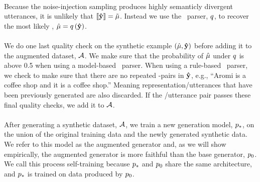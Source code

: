     \paragraph{} Because the noise-injection sampling produces highly
semanticly divergent utterances, it is unlikely that $\left\llbracket \boldsymbol{\hat{\mathbf{y}}}  \right\rrbracket = \tilde{\mu}$. Instead we use the \meaningrepresentation~parser, $q$, to
recover the most likely \meaningrepresentation, $\hat{\mu} = q\left(\boldsymbol{\hat{\mathbf{y}}}\right)$.

\paragraph{}
We do one last quality check on the synthetic example $(\hat{\mu},\boldsymbol{\hat{\mathbf{y}}})$ before adding it to the augmented dataset, ${\mathcal{A}}$. We make sure that
the probability of $\hat{\mu}$ under $q$ is above 0.5 when using
a model-based \meaningrepresentation~parser. When using a rule-based
\meaningrepresentation~parser, we check to make sure that there are no
repeated \attributevalue-pairs in $\boldsymbol{\hat{\mathbf{y}}}$, e.g., ``Aromi is a 
coffee shop and it is a coffee shop.'' Meaning representation/utterances that
have been previously generated are also discarded. If the \meaningrepresentation/utterance
pair passes these final quality checks, we add it to ${\mathcal{A}}$.

\paragraph{} After generating a synthetic dataset, ${\mathcal{A}}$, we train a new 
generation model, $p_*$, on the union of the original training data
and the newly generated synthetic data. We refer to this model as 
the augmented generator and, as we will show empirically, the augmented
generator is more faithful than the base generator, $p_0$.
We call this process self-training because $p_*$ and $p_0$ share 
the same architecture, and $p_*$ is trained on data produced by $p_0$.


